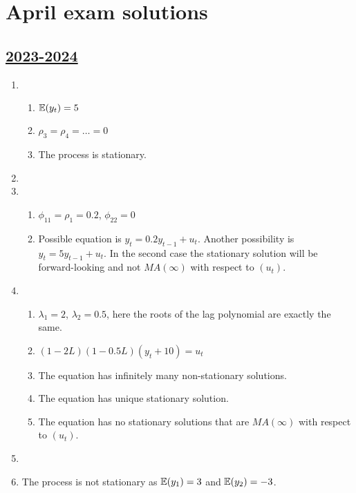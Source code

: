 
\newpage
\thispagestyle{empty}
\section{April exam solutions}

\subsection[2023-2024]{\hyperref[sec:kr_03_2023_2024]{2023-2024}}
\label{sec:sol_kr_03_2023_2024} %

\begin{enumerate}
    \item 
    \begin{enumerate}
        \item $\operatorname{\mathbb{E}}(y_t) = 5$
        \item $\rho_3 = \rho_4 = \ldots = 0$
        \item The process is stationary.
    \end{enumerate}
    \item 
    \item 
    \begin{enumerate}
        \item $\phi_{11} = \rho_1 = 0.2$, $\phi_{22} = 0$
        \item Possible equation is $y_t = 0.2 y_{t-1} + u_t$. 
        Another possibility is $y_t = 5 y_{t-1} + u_t$. 
        In the second case the stationary solution will be forward-looking and not $MA(\infty)$ with respect to $(u_t)$.
    \end{enumerate}
    \item 
    \begin{enumerate}
        \item $\lambda_1 = 2$, $\lambda_2 = 0.5$, here the roots of the lag polynomial are exactly the same. 
        \item $(1 - 2L)(1 - 0.5L) (y_t + 10) = u_t$
        \item The equation has infinitely many non-stationary solutions.
        \item The equation has unique stationary solution.
        \item The equation has no stationary solutions that are $MA(\infty)$ with respect to $(u_t)$.
    \end{enumerate}
    \item 
    \item The process is not stationary as $\operatorname{\mathbb{E}}(y_1) = 3$ and $\operatorname{\mathbb{E}}(y_2) = -3$.

\end{enumerate}


